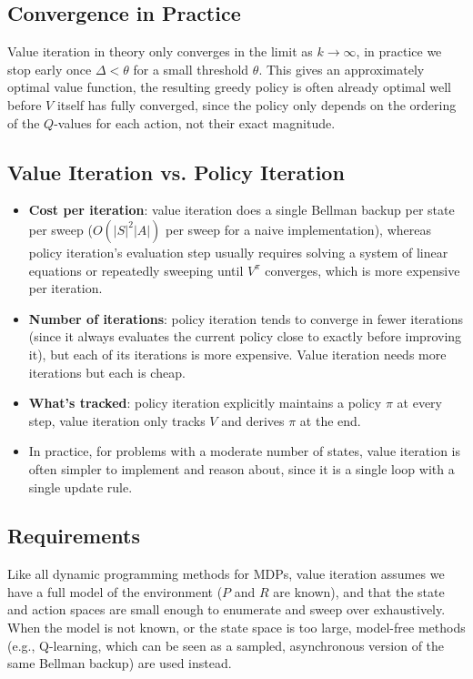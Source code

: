 \documentclass[conference]{IEEEtran}
\begin{document}
\subsection*{Convergence in Practice}
Value iteration in theory only converges in the limit as $k \to \infty$, in practice we stop early once $\Delta < \theta$ for a small threshold $\theta$. This gives an approximately optimal value function, the resulting greedy policy is often already optimal well before $V$ itself has fully converged, since the policy only depends on the ordering of the $Q$-values for each action, not their exact magnitude.

\subsection*{Value Iteration vs. Policy Iteration}
\begin{itemize}
    \item \textbf{Cost per iteration}: value iteration does a single Bellman backup per state per sweep ($O(|S|^2|A|)$ per sweep for a naive implementation), whereas policy iteration's evaluation step usually requires solving a system of linear equations or repeatedly sweeping until $V^\pi$ converges, which is more expensive per iteration.
    \item \textbf{Number of iterations}: policy iteration tends to converge in fewer iterations (since it always evaluates the current policy close to exactly before improving it), but each of its iterations is more expensive. Value iteration needs more iterations but each is cheap.
    \item \textbf{What's tracked}: policy iteration explicitly maintains a policy $\pi$ at every step, value iteration only tracks $V$ and derives $\pi$ at the end.
    \item In practice, for problems with a moderate number of states, value iteration is often simpler to implement and reason about, since it is a single loop with a single update rule.
\end{itemize}

\subsection*{Requirements}
Like all dynamic programming methods for MDPs, value iteration assumes we have a full model of the environment ($P$ and $R$ are known), and that the state and action spaces are small enough to enumerate and sweep over exhaustively. When the model is not known, or the state space is too large, model-free methods (e.g., Q-learning, which can be seen as a sampled, asynchronous version of the same Bellman backup) are used instead.
\end{document}
